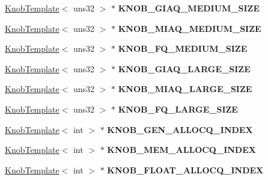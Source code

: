 \begin{DoxyCompactItemize}
\item 
\hypertarget{classall__knobs__c_a0e6368a53d862dc2fa52038df9173d7e}{
\hyperlink{classKnobTemplate}{KnobTemplate}$<$ uns32 $>$ $\ast$ {\bfseries KNOB\_\-GIAQ\_\-MEDIUM\_\-SIZE}}
\label{classall__knobs__c_a0e6368a53d862dc2fa52038df9173d7e}

\item 
\hypertarget{classall__knobs__c_a8fb7846e838b7a45b03215d114d86342}{
\hyperlink{classKnobTemplate}{KnobTemplate}$<$ uns32 $>$ $\ast$ {\bfseries KNOB\_\-MIAQ\_\-MEDIUM\_\-SIZE}}
\label{classall__knobs__c_a8fb7846e838b7a45b03215d114d86342}

\item 
\hypertarget{classall__knobs__c_a145e6cfb8f599305d9098c732e313282}{
\hyperlink{classKnobTemplate}{KnobTemplate}$<$ uns32 $>$ $\ast$ {\bfseries KNOB\_\-FQ\_\-MEDIUM\_\-SIZE}}
\label{classall__knobs__c_a145e6cfb8f599305d9098c732e313282}

\item 
\hypertarget{classall__knobs__c_adae886ac220a51b8d2b3b49e12ca0251}{
\hyperlink{classKnobTemplate}{KnobTemplate}$<$ uns32 $>$ $\ast$ {\bfseries KNOB\_\-GIAQ\_\-LARGE\_\-SIZE}}
\label{classall__knobs__c_adae886ac220a51b8d2b3b49e12ca0251}

\item 
\hypertarget{classall__knobs__c_a06f387d83d575fbd9afc33fc7b373363}{
\hyperlink{classKnobTemplate}{KnobTemplate}$<$ uns32 $>$ $\ast$ {\bfseries KNOB\_\-MIAQ\_\-LARGE\_\-SIZE}}
\label{classall__knobs__c_a06f387d83d575fbd9afc33fc7b373363}

\item 
\hypertarget{classall__knobs__c_a90de3db4cf191362e868ab3da1ab24a5}{
\hyperlink{classKnobTemplate}{KnobTemplate}$<$ uns32 $>$ $\ast$ {\bfseries KNOB\_\-FQ\_\-LARGE\_\-SIZE}}
\label{classall__knobs__c_a90de3db4cf191362e868ab3da1ab24a5}

\item 
\hypertarget{classall__knobs__c_a4b2e8e685a55e75c49eca227e825dea9}{
\hyperlink{classKnobTemplate}{KnobTemplate}$<$ int $>$ $\ast$ {\bfseries KNOB\_\-GEN\_\-ALLOCQ\_\-INDEX}}
\label{classall__knobs__c_a4b2e8e685a55e75c49eca227e825dea9}

\item 
\hypertarget{classall__knobs__c_a938f4b2aae4e897b4dde949f0c1c2e30}{
\hyperlink{classKnobTemplate}{KnobTemplate}$<$ int $>$ $\ast$ {\bfseries KNOB\_\-MEM\_\-ALLOCQ\_\-INDEX}}
\label{classall__knobs__c_a938f4b2aae4e897b4dde949f0c1c2e30}

\item 
\hypertarget{classall__knobs__c_a0ec215d7422bade9f0b25419ed8c6181}{
\hyperlink{classKnobTemplate}{KnobTemplate}$<$ int $>$ $\ast$ {\bfseries KNOB\_\-FLOAT\_\-ALLOCQ\_\-INDEX}}
\label{classall__knobs__c_a0ec215d7422bade9f0b25419ed8c6181}


\end{DoxyCompactItemize}
